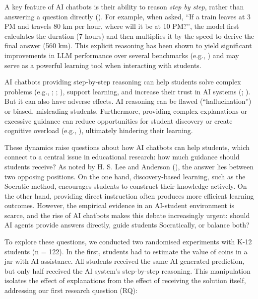 \documentclass[
  11pt,
]{article}
\begin{document}
A key feature of AI chatbots is their ability to reason \emph{step by step}, rather than answering a question directly (). For example, when asked, ``If a train leaves at 3 PM and travels 80 km per hour, where will it be at 10 PM?'', the model first calculates the duration (7 hours) and then multiplies it by the speed to derive the final answer (560 km). This explicit reasoning has been shown to yield significant improvements in LLM performance over several benchmarks (e.g., ) and may serve as a powerful learning tool when interacting with students.

AI chatbots providing step-by-step reasoning can help students solve complex problems (e.g., ; ; ), support learning, and increase their trust in AI systems (; ). But it can also have adverse effects. AI reasoning can be flawed (``hallucination'') or biased, misleading students. Furthermore, providing complex explanations or excessive guidance can reduce opportunities for student discovery or create cognitive overload (e.g., ), ultimately hindering their learning.

These dynamics raise questions about how AI chatbots can help students, which connect to a central issue in educational research: how much guidance should students receive? As noted by H. S. Lee and Anderson (), the answer lies between two opposing positions. On the one hand, discovery-based learning, such as the Socratic method, encourages students to construct their knowledge actively. On the other hand, providing direct instruction often produces more efficient learning outcomes. However, the empirical evidence in an AI-student environment is scarce, and the rise of AI chatbots makes this debate increasingly urgent: should AI agents provide answers directly, guide students Socratically, or balance both?

To explore these questions, we conducted two randomised experiments with K-12 students (n = 122). In the first, students had to estimate the value of coins in a jar with AI assistance. All students received the same AI-generated prediction, but only half received the AI system's step-by-step reasoning. This manipulation isolates the effect of explanations from the effect of receiving the solution itself, addressing our first research question (RQ):
\end{document}
